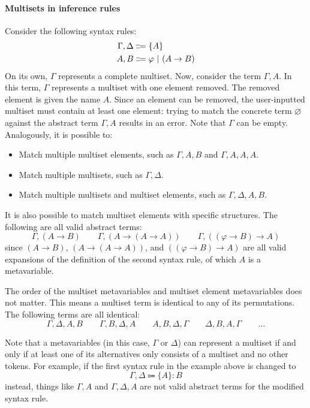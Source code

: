 \paragraph{Multisets in inference rules}
\label{inference:multisets}
Consider the following syntax rules:
\begin{align*}
    \Gamma, \Delta &\Coloneqq \{ A \} \\
    A, B &\Coloneqq \varphi \ |\  (A \to B)
\end{align*}
On its own, $\Gamma$ represents a complete multiset. Now, consider the term $\Gamma, A$. In this term, $\Gamma$ represents a multiset with one element removed. The removed element is given the name $A$. Since an element can be removed, the user-inputted multiset must contain at least one element: trying to match the concrete term $\varnothing$ against the abstract term $\Gamma, A$ results in an error. Note that $\Gamma$ can be empty. Analogously, it is possible to:
\begin{itemize}
    \item Match multiple multiset elements, such as $\Gamma, A, B$ and $\Gamma, A, A, A$.
    \item Match multiple multisets, such as $\Gamma, \Delta$.
    \item Match multiple multisets and multiset elements, such as $\Gamma, \Delta, A, B$.
\end{itemize}

It is also possible to match multiset elements with specific structures. The following are all valid abstract terms:
\[
    \Gamma, (A \to B) \qquad \Gamma, (A \to (A \to A)) \qquad \Gamma, ((\varphi \to B) \to A)
\]
since $(A \to B)$, $(A \to (A \to A))$, and $((\varphi \to B) \to A)$ are all valid expansions of the definition of the second syntax rule, of which $A$ is a metavariable.

The order of the multiset metavariables and multiset element metavariables does not matter. This means a multiset term is identical to any of its permutations. The following terms are all identical:
\[
    \Gamma, \Delta, A, B \qquad \Gamma, B, \Delta, A \qquad A, B, \Delta, \Gamma \qquad \Delta, B, A, \Gamma \qquad \ldots
\]

Note that a metavariables (in this case, $\Gamma$ or $\Delta$) can represent a multiset if and only if at least one of its alternatives only consists of a multiset and no other tokens. For example, if the first syntax rule in the example above is changed to
\[
    \Gamma, \Delta \Coloneqq \{ A \}: B
\]
instead, things like $\Gamma, A$ and $\Gamma, \Delta, A$ are not valid abstract terms for the modified syntax rule.

